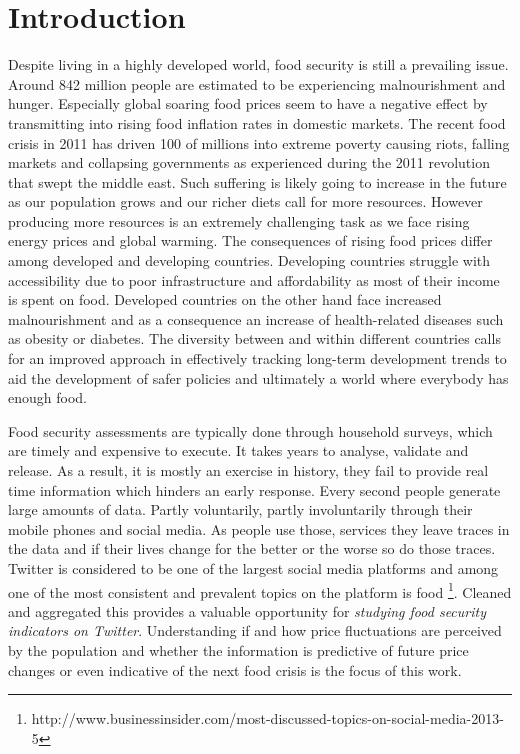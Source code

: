 

\let\cleardoublepage\clearpage


\chapter{Introduction}

Despite living in a highly developed world, food security is still a prevailing issue. Around 842 million people are estimated to be experiencing malnourishment and hunger. Especially global soaring food prices seem to have a negative effect by transmitting into rising food inflation rates in domestic markets. The recent food crisis in 2011 has driven 100 of millions into extreme poverty causing riots, falling markets and collapsing governments as experienced during the 2011 revolution that swept the middle east. Such suffering is likely going to increase in the future as our population grows and our richer diets call for more resources. However producing more resources is an extremely challenging task as we face rising energy prices and global warming. The consequences of rising food prices differ among developed and developing countries. Developing countries struggle with accessibility due to poor infrastructure and affordability as most of their income is spent on food. Developed countries on the other hand face increased malnourishment and as a consequence an increase of health-related diseases such as obesity or diabetes. The diversity between and within different countries calls for an improved approach in effectively tracking long-term development trends to aid the development of safer policies and ultimately a world where everybody has enough food. 

Food security assessments are typically done through household surveys, which are timely and expensive to execute. It takes years to analyse, validate and release. As a result, it is mostly an exercise in history, they fail to provide real time information which hinders an early response. Every second people generate large amounts of data. Partly voluntarily, partly involuntarily through their mobile phones and social media. As people use those, services they leave traces in the data and if their lives change for the better or the worse so do those traces. Twitter is considered to be one of the largest social media platforms and among one of the most consistent and prevalent topics on the platform is food \footnote{http://www.businessinsider.com/most-discussed-topics-on-social-media-2013-5}. Cleaned and aggregated this provides a valuable opportunity for \emph{studying food security indicators on Twitter}. Understanding if and how price fluctuations are perceived by the population and whether the information is predictive of future price changes or even indicative of the next food crisis is the focus of this work. 

